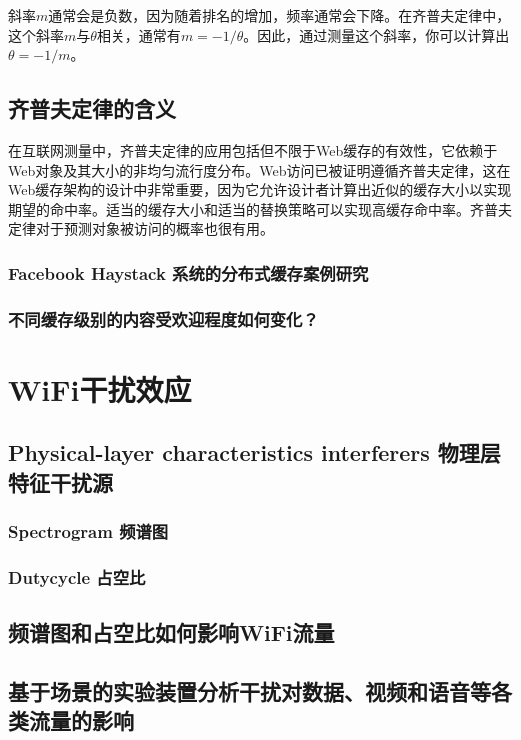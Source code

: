 斜率$m$通常会是负数，因为随着排名的增加，频率通常会下降。在齐普夫定律中，这个斜率$m$与$\theta$相关，通常有$m=−1/\theta$。因此，通过测量这个斜率，你可以计算出$\theta=−1/m$。
\section{齐普夫定律的含义}

在互联网测量中，齐普夫定律的应用包括但不限于Web缓存的有效性，它依赖于Web对象及其大小的非均匀流行度分布。Web访问已被证明遵循齐普夫定律，这在Web缓存架构的设计中非常重要，因为它允许设计者计算出近似的缓存大小以实现期望的命中率。适当的缓存大小和适当的替换策略可以实现高缓存命中率。齐普夫定律对于预测对象被访问的概率也很有用。

\subsection{Facebook Haystack 系统的分布式缓存案例研究}

\subsection{不同缓存级别的内容受欢迎程度如何变化？}

\chapter{WiFi干扰效应}

\section{Physical-layer characteristics interferers 物理层特征干扰源}

\subsection{Spectrogram 频谱图}

\subsection{Dutycycle 占空比}

\section{频谱图和占空比如何影响WiFi流量}

\section{基于场景的实验装置分析干扰对数据、视频和语音等各类流量的影响}

